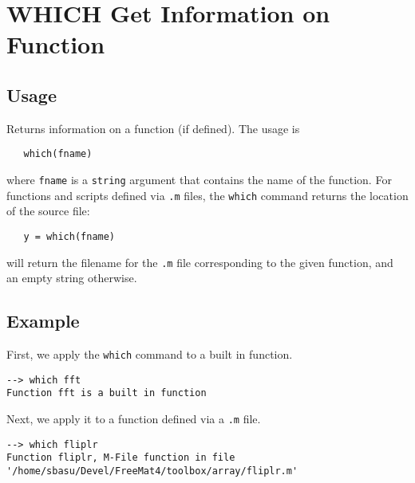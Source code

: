 \section{WHICH Get Information on Function}

\subsection{Usage}

Returns information on a function (if defined).  The usage is
\begin{verbatim}
   which(fname)
\end{verbatim}
where \verb|fname| is a \verb|string| argument that contains the name of the 
function.  For functions and scripts defined
via \verb|.m| files, the \verb|which| command returns the location of the source
file:
\begin{verbatim}
   y = which(fname)
\end{verbatim}
will return the filename for the \verb|.m| file corresponding to the given
function, and an empty string otherwise.
\subsection{Example}

First, we apply the \verb|which| command to a built in function.
\begin{verbatim}
--> which fft
Function fft is a built in function
\end{verbatim}
Next, we apply it to a function defined via a \verb|.m| file.
\begin{verbatim}
--> which fliplr
Function fliplr, M-File function in file '/home/sbasu/Devel/FreeMat4/toolbox/array/fliplr.m'
\end{verbatim}
